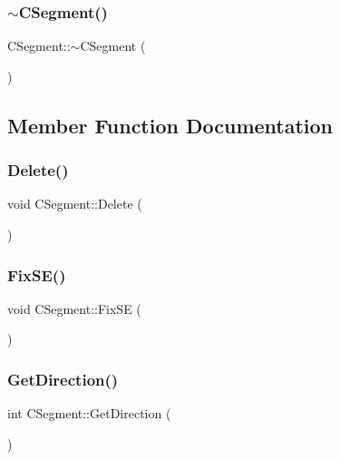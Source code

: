 \mbox{\label{classCSegment_a23c7a168b7a27aa3b8ad88862d7155a4}} 
\subsubsection{\texorpdfstring{$\sim$CSegment()}{~CSegment()}}
{\footnotesize\ttfamily C\+Segment\+::$\sim$\+C\+Segment (\begin{DoxyParamCaption}{ }\end{DoxyParamCaption})\hspace{0.3cm}{\ttfamily [virtual]}}



\subsection{Member Function Documentation}
\mbox{\label{classCSegment_ade04e03ed36a0f8a6dc95edb73394655}} 
\subsubsection{\texorpdfstring{Delete()}{Delete()}}
{\footnotesize\ttfamily void C\+Segment\+::\+Delete (\begin{DoxyParamCaption}{ }\end{DoxyParamCaption})}

\mbox{\label{classCSegment_a05f048fb98b7138ffe4959d143b9267a}} 
\subsubsection{\texorpdfstring{FixSE()}{FixSE()}}
{\footnotesize\ttfamily void C\+Segment\+::\+Fix\+SE (\begin{DoxyParamCaption}{ }\end{DoxyParamCaption})}

\mbox{\label{classCSegment_ae9a06a9de5c4375d85fcd451132bdd72}} 
\subsubsection{\texorpdfstring{GetDirection()}{GetDirection()}}
{\footnotesize\ttfamily int C\+Segment\+::\+Get\+Direction (\begin{DoxyParamCaption}{ }\end{DoxyParamCaption})}

